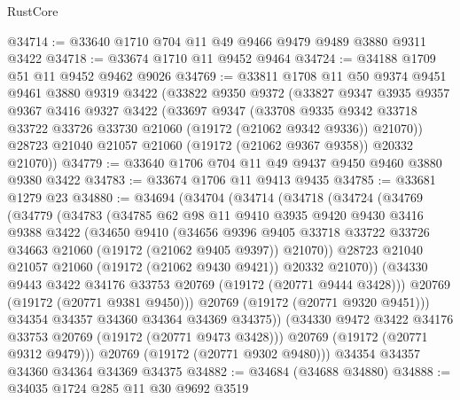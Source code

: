 \begin{lexlean}{RustCore}
\begin{coremodule}
@34714 := @33640 @1710 @704 @11 @49 @9466 @9479 @9489 @3880 @9311 @3422
@34718 := @33674 @1710 @11 @9452 @9464
@34724 := @34188 @1709 @51 @11 @9452 @9462 @9026
@34769 := @33811
    @1708
    @11
    @50
    @9374
    @9451
    @9461
    @3880
    @9319
    @3422
    (@33822
      @9350
      @9372
      (@33827
        @9347
        @3935
        @9357
        @9367
        @3416
        @9327
        @3422
        (@33697
          @9347
          (@33708
            @9335
            @9342
            @33718
            @33722
            @33726
            @33730
            @21060
            (@19172 (@21062 @9342 @9336))
            @21070))
        @28723
        @21040
        @21057
        @21060
        (@19172 (@21062 @9367 @9358))
        @20332
        @21070))
@34779 := @33640 @1706 @704 @11 @49 @9437 @9450 @9460 @3880 @9380 @3422
@34783 := @33674 @1706 @11 @9413 @9435
@34785 := @33681 @1279 @23
@34880 := @34694
    (@34704
      (@34714
        (@34718
          (@34724
            (@34769
              (@34779
                (@34783
                  (@34785
                    @62
                    @98
                    @11
                    @9410
                    @3935
                    @9420
                    @9430
                    @3416
                    @9388
                    @3422
                    (@34650
                      @9410
                      (@34656
                        @9396
                        @9405
                        @33718
                        @33722
                        @33726
                        @34663
                        @21060
                        (@19172 (@21062 @9405 @9397))
                        @21070))
                    @28723
                    @21040
                    @21057
                    @21060
                    (@19172 (@21062 @9430 @9421))
                    @20332
                    @21070))
                (@34330 @9443 @3422 @34176 @33753 @20769 (@19172 (@20771 @9444 @3428)))
                @20769
                (@19172 (@20771 @9381 @9450)))
              @20769
              (@19172 (@20771 @9320 @9451)))
            @34354
            @34357
            @34360
            @34364
            @34369
            @34375))
        (@34330 @9472 @3422 @34176 @33753 @20769 (@19172 (@20771 @9473 @3428)))
        @20769
        (@19172 (@20771 @9312 @9479)))
      @20769
      (@19172 (@20771 @9302 @9480)))
    @34354
    @34357
    @34360
    @34364
    @34369
    @34375
@34882 := @34684 (@34688 @34880)
@34888 := @34035 @1724 @285 @11 @30 @9692 @3519

\end{coremodule}
\end{lexlean}

